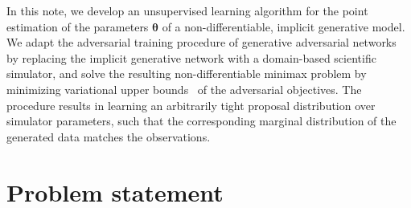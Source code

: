 \documentclass[twocolumn,superscriptaddress,aps]{revtex4-1}
\newcommand{\bftheta}{{\bm \theta}}
\theoremstyle{plain}
\begin{document}
In this note, we develop an unsupervised learning algorithm for the point
estimation of the parameters $\bftheta$ of a non-differentiable, implicit
generative model. We adapt the adversarial
training procedure of generative adversarial
networks~\cite{goodfellow2014generative} by replacing the implicit generative
network with a domain-based scientific simulator, and solve the resulting
non-differentiable minimax problem by minimizing variational upper
bounds~\citep{2011arXiv1106.4487W,2012arXiv1212.4507S} of the adversarial
objectives. The procedure results in learning an arbitrarily tight
proposal distribution over simulator parameters, such that the corresponding
marginal distribution of the generated data matches the observations.





\section{Problem statement}
\label{sec:problem}
\end{document}
